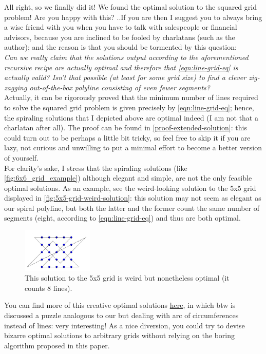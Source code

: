 \documentclass[11pt]{article}
\begin{document}
All right, so we finally did it! We found the optimal solution to the squared grid problem! Are you happy with this? ..If you are then I suggest you to always bring a wise friend with you when you have to talk with salespeople or financial advisors, because you are inclined to be fooled by charlatans (such as the author); and the reason is that you should be tormented by this question:\\
\emph{Can we really claim that the solutions output according to the aforementioned recursive recipe are actually optimal and therefore that \autoref{eqn:line-grid-eq} is actually valid? Isn't that possible (at least for some grid size) to find a clever zig-zagging out-of-the-box polyline consisting of even fewer segments?}\\
Actually, it can be rigorously proved that the minimum number of lines required to solve the squared grid problem is given precisely by \autoref{eqn:line-grid-eq}; hence, the spiraling solutions that I depicted above are optimal indeed (I am not that a charlatan after all). The proof can be found in \autoref{proof-extended-solution}: this could turn out to be perhaps a little bit tricky, so feel free to skip it if you are lazy, not curious and unwilling to put a minimal effort to become a better version of yourself.\\
For clarity's sake, I stress that the spiraling solutions (like \autoref{fig:6x6_grid_example}) although elegant and simple, are not the only feasible optimal solutions. As an example, see the weird-looking solution to the 5x5 grid displayed in \autoref{fig:5x5-grid-weird-solution}: this solution may not seem as elegant as our spiral polyline, but both the latter and the former count the same number of segments (eight, according to \autoref{eqn:line-grid-eq}) and thus are both optimal.
\begin{figure}[H]
\centering
\includegraphics[width=0.3\textwidth]{images/5x5-grid-weird-solution.png}
\caption{This solution to the 5x5 grid is weird but nonetheless optimal (it counts 8 lines).} %
\label{fig:5x5-grid-weird-solution}
\end{figure}
You can find more of this creative optimal solutions \href{http://www.mathpuzzle.com/dots.html}{here}, in which btw is discussed a puzzle analogous to our but dealing with arc of circumferences instead of lines: very interesting! As a nice diversion, you could try to devise bizarre optimal solutions to arbitrary grids without relying on the boring algorithm proposed in this paper.
\end{document}
